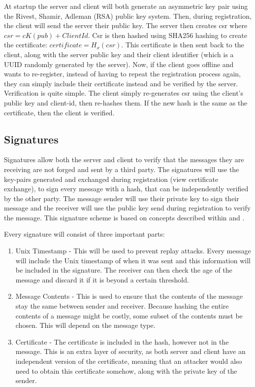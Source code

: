 At startup the server and client will both generate an asymmetric key pair using the Rivest, Shamir, Adleman (RSA) public key system. Then, during registration, the client will send the server their public key. The server then creates csr where \(csr = cK(pub) + ClientId\). Csr is then hashed using SHA256 hashing to create the certificate: \(certificate = H_x(csr)\). This certificate is then sent back to the client, along with the server public key and their client identifier (which is a UUID randomly generated by the server). Now, if the client goes offline and wants to re-register, instead of having to repeat the registration process again, they can simply include their certificate instead and be verified by the server. Verification is quite simple. The client simply re-generates csr using the client's public key and client-id, then re-hashes them. If the new hash is the same as the certificate, then the client is verified.

\subsection{Signatures}
Signatures allow both the server and client to verify that the messages they are receiving are not forged and sent by a third party. The signatures will use the key-pairs generated and exchanged during registration (view certificate exchange), to sign every message with a hash, that can be independently verified by the other party. The message sender will use their private key to sign their message and the receiver will use the public key send during registration to verify the message. This signature scheme is based on concepts described within \cite{disSysConceptsDesign} and \cite{disSysPrinciples}.

Every signature will consist of three important parts:
\begin{enumerate}
    \item Unix Timestamp - This will be used to prevent replay attacks. Every message will include the Unix timestamp of when it was sent and this information will be included in the signature. The receiver can then check the age of the message and discard it if it is beyond a certain threshold.
    \item Message Contents - This is used to ensure that the contents of the message stay the same between sender and receiver. Because hashing the entire contents of a message might be costly, some subset of the contents must be chosen. This will depend on the message type.
    \item Certificate - The certificate is included in the hash, however not in the message. This is an extra layer of security, as both server and client have an independent version of the certificate, meaning that an attacker would also need to obtain this certificate somehow, along with the private key of the sender.
\end{enumerate}

